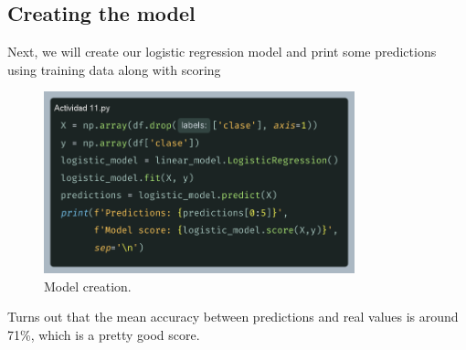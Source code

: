 \documentclass[10pt]{article}
\begin{document}
\subsection{Creating the model}
Next, we will create our logistic regression model and print some predictions using training data along with scoring \par
\begin{figure}[h]
  \centering
  \includegraphics[width=90mm]{./images/2025-03-28-10-19-02.png}
  \caption{Model creation.}
\end{figure}
Turns out that the mean accuracy between predictions and real values is around 71\%, which is a pretty good score.
\end{document}

